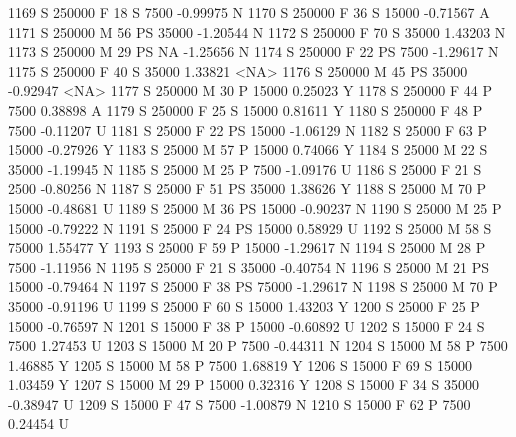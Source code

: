 \documentclass{article}
\begin{document}
\begin{Schunk}
\begin{Soutput}
1169      S     250000   F  18         S   7500  -0.99975    N
1170      S     250000   F  36         S  15000  -0.71567    A
1171      S     250000   M  56        PS  35000  -1.20544    N
1172      S     250000   F  70         S  35000   1.43203    N
1173      S     250000   M  29        PS     NA  -1.25656    N
1174      S     250000   F  22        PS   7500  -1.29617    N
1175      S     250000   F  40         S  35000   1.33821 <NA>
1176      S     250000   M  45        PS  35000  -0.92947 <NA>
1177      S     250000   M  30         P  15000   0.25023    Y
1178      S     250000   F  44         P   7500   0.38898    A
1179      S     250000   F  25         S  15000   0.81611    Y
1180      S     250000   F  48         P   7500  -0.11207    U
1181      S      25000   F  22        PS  15000  -1.06129    N
1182      S      25000   F  63         P  15000  -0.27926    Y
1183      S      25000   M  57         P  15000   0.74066    Y
1184      S      25000   M  22         S  35000  -1.19945    N
1185      S      25000   M  25         P   7500  -1.09176    U
1186      S      25000   F  21         S   2500  -0.80256    N
1187      S      25000   F  51        PS  35000   1.38626    Y
1188      S      25000   M  70         P  15000  -0.48681    U
1189      S      25000   M  36        PS  15000  -0.90237    N
1190      S      25000   M  25         P  15000  -0.79222    N
1191      S      25000   F  24        PS  15000   0.58929    U
1192      S      25000   M  58         S  75000   1.55477    Y
1193      S      25000   F  59         P  15000  -1.29617    N
1194      S      25000   M  28         P   7500  -1.11956    N
1195      S      25000   F  21         S  35000  -0.40754    N
1196      S      25000   M  21        PS  15000  -0.79464    N
1197      S      25000   F  38        PS  75000  -1.29617    N
1198      S      25000   M  70         P  35000  -0.91196    U
1199      S      25000   F  60         S  15000   1.43203    Y
1200      S      25000   F  25         P  15000  -0.76597    N
1201      S      15000   F  38         P  15000  -0.60892    U
1202      S      15000   F  24         S   7500   1.27453    U
1203      S      15000   M  20         P   7500  -0.44311    N
1204      S      15000   M  58         P   7500   1.46885    Y
1205      S      15000   M  58         P   7500   1.68819    Y
1206      S      15000   F  69         S  15000   1.03459    Y
1207      S      15000   M  29         P  15000   0.32316    Y
1208      S      15000   F  34         S  35000  -0.38947    U
1209      S      15000   F  47         S   7500  -1.00879    N
1210      S      15000   F  62         P   7500   0.24454    U

\end{Soutput}
\end{Schunk}
\end{document}
